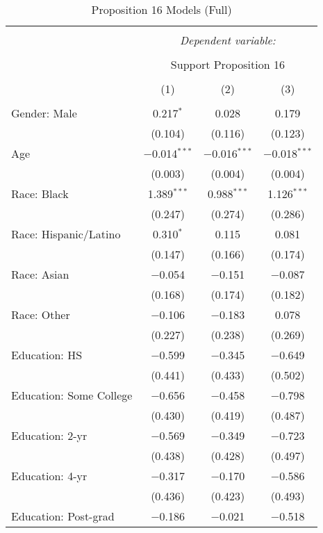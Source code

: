 
\begin{table}[!htbp] \centering 
  \caption{Proposition 16 Models (Full)} 
  \label{tab:reg_prop16_long} 
\footnotesize 
\begin{tabular}{@{\extracolsep{5pt}}lccc} 
\\[-1.8ex]\hline 
\hline \\[-1.8ex] 
 & \multicolumn{3}{c}{\textit{Dependent variable:}} \\ 
\cline{2-4} 
\\[-1.8ex] & \multicolumn{3}{c}{Support Proposition 16} \\ 
\\[-1.8ex] & (1) & (2) & (3)\\ 
\hline \\[-1.8ex] 
 Gender: Male & 0.217$^{*}$ & 0.028 & 0.179 \\ 
  & (0.104) & (0.116) & (0.123) \\ 
  Age & $-$0.014$^{***}$ & $-$0.016$^{***}$ & $-$0.018$^{***}$ \\ 
  & (0.003) & (0.004) & (0.004) \\ 
  Race: Black & 1.389$^{***}$ & 0.988$^{***}$ & 1.126$^{***}$ \\ 
  & (0.247) & (0.274) & (0.286) \\ 
  Race: Hispanic/Latino & 0.310$^{*}$ & 0.115 & 0.081 \\ 
  & (0.147) & (0.166) & (0.174) \\ 
  Race: Asian & $-$0.054 & $-$0.151 & $-$0.087 \\ 
  & (0.168) & (0.174) & (0.182) \\ 
  Race: Other & $-$0.106 & $-$0.183 & 0.078 \\ 
  & (0.227) & (0.238) & (0.269) \\ 
  Education: HS & $-$0.599 & $-$0.345 & $-$0.649 \\ 
  & (0.441) & (0.433) & (0.502) \\ 
  Education: Some College & $-$0.656 & $-$0.458 & $-$0.798 \\ 
  & (0.430) & (0.419) & (0.487) \\ 
  Education: 2-yr & $-$0.569 & $-$0.349 & $-$0.723 \\ 
  & (0.438) & (0.428) & (0.497) \\ 
  Education: 4-yr & $-$0.317 & $-$0.170 & $-$0.586 \\ 
  & (0.436) & (0.423) & (0.493) \\ 
  Education: Post-grad & $-$0.186 & $-$0.021 & $-$0.518 \\ 

\end{tabular}
\end{table}
